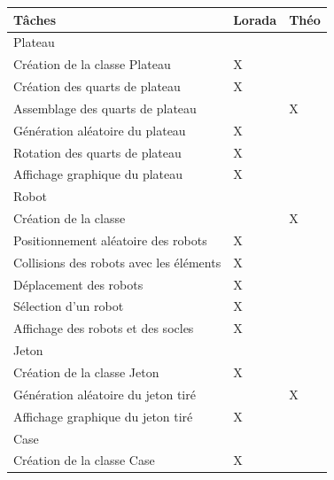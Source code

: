 \documentclass[a4paper, 12pt]{article}
\begin{document}
    \begin{center}
        \begin{tabular}{|p{7cm}|>{\centering\arraybackslash}p{4cm}|>{\centering\arraybackslash}p{4cm}|}
            \hline
                Tâches & Lorada & Théo \\
            \hline %
                \rowcolor{ashgrey} Plateau  & &\\
                 Création de la classe Plateau & X & \\
                 \hline
                 Création des quarts de plateau & X & \\
                 \hline
                 Assemblage des quarts de plateau &  & X \\
                 \hline
                 Génération aléatoire du plateau & X & \\
                 \hline
                 Rotation des quarts de plateau & X & \\
                 \hline
                 Affichage graphique du plateau & X & \\
            \hline %
                \rowcolor{ashgrey} Robot  & &\\
                 Création de la classe &  & X \\
                 \hline
                 Positionnement aléatoire des robots & X &\\
                 \hline
                 Collisions des robots avec les éléments & X &\\
                 \hline 
                 Déplacement des robots & X &\\
                 \hline 
                 Sélection d'un robot & X &\\
                 \hline
                 Affichage des robots et des socles & X & \\
            \hline %
                \rowcolor{ashgrey} Jeton  & &\\
                 Création de la classe Jeton & X & \\
                \hline
                Génération aléatoire du jeton tiré & & X\\
                \hline
                Affichage graphique du jeton tiré & X & \\
             \hline %
                \rowcolor{ashgrey} Case  & &\\
                 Création de la classe Case & X & \\

\end{tabular}
\end{center}
\end{document}
